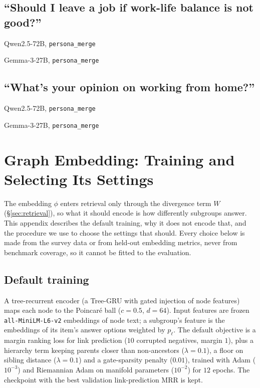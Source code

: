 \documentclass[11pt]{article}
\begin{document}
\subsection*{``Should I leave a job if work-life balance is not good?''}

\begin{answerbox}{Qwen2.5-72B, \texttt{persona\_merge}}

\end{answerbox}

\begin{answerbox}{Gemma-3-27B, \texttt{persona\_merge}}

\end{answerbox}

\subsection*{``What's your opinion on working from home?''}

\begin{answerbox}{Qwen2.5-72B, \texttt{persona\_merge}}

\end{answerbox}

\begin{answerbox}{Gemma-3-27B, \texttt{persona\_merge}}

\end{answerbox}

\section{Graph Embedding: Training and Selecting Its Settings}
\label{app:embedding}

The embedding $\phi$ enters retrieval only through the divergence term $W$
(\S\ref{sec:retrieval}), so what it should encode is how differently subgroups
answer. This appendix describes the default training, why it does not encode
that, and the procedure we use to choose the settings that should. Every choice
below is made from the survey data or from held-out embedding metrics, never
from benchmark coverage, so it cannot be fitted to the evaluation.

\subsection{Default training}
A tree-recurrent encoder (a Tree-GRU with gated injection of node features)
maps each node to the Poincar\'e ball ($c = 0.5$, $d = 64$). Input features
are frozen \texttt{all-MiniLM-L6-v2} embeddings of node text; a subgroup's
feature is the embeddings of its item's answer options weighted by $p_\ell$.
The default objective is a margin ranking loss for link prediction
($10$ corrupted negatives, margin $1$), plus a hierarchy term keeping parents
closer than non-ancestors ($\lambda = 0.1$), a floor on sibling distance
($\lambda = 0.1$) and a gate-sparsity penalty ($0.01$), trained with Adam
($10^{-3}$) and Riemannian Adam on manifold parameters ($10^{-2}$) for
$12$ epochs. The checkpoint with the best validation link-prediction MRR is
kept.
\end{document}
